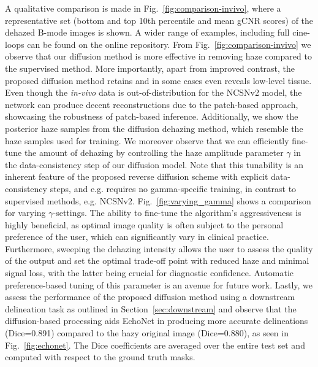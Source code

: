 A qualitative comparison is made in Fig.~\ref{fig:comparison-invivo}, where a representative set (bottom and top 10th percentile and mean gCNR scores) of the dehazed B-mode images is shown. A wider range of examples, including full cine-loops can be found on the online repository. From Fig.~\ref{fig:comparison-invivo} we observe that our diffusion method is more effective in removing haze compared to the supervised method. More importantly, apart from improved contrast, the proposed diffusion method retains and in some cases even reveals low-level tissue. Even though the \emph{in-vivo} data is out-of-distribution for the NCSNv2 model, the network can produce decent reconstructions due to the patch-based approach, showcasing the robustness of patch-based inference. Additionally, we show the posterior haze samples from the diffusion dehazing method, which resemble the haze samples used for training. We moreover observe that we can efficiently fine-tune the amount of dehazing by controlling the haze amplitude parameter $\gamma$ in the data-consistency step of our diffusion model. Note that this tunability is an inherent feature of the proposed reverse diffusion scheme with explicit data-consistency steps, and e.g. requires no gamma-specific training, in contrast to supervised methods, e.g. NCSNv2. Fig.~\ref{fig:varying_gamma} shows a comparison for varying $\gamma$-settings. The ability to fine-tune the algorithm's aggressiveness is highly beneficial, as optimal image quality is often subject to the personal preference of the user, which can significantly vary in clinical practice. Furthermore, sweeping the dehazing intensity allows the user to assess the quality of the output and set the optimal trade-off point with reduced haze and minimal signal loss, with the latter being crucial for diagnostic confidence. Automatic preference-based tuning of this parameter is an avenue for future work. Lastly, we assess the performance of the proposed diffusion method using a downstream delineation task as outlined in Section~\ref{sec:downstream} and observe that the diffusion-based processing aids EchoNet in producing more accurate delineations (Dice=0.891) compared to the hazy original image (Dice=0.880), as seen in Fig.~\ref{fig:echonet}. The Dice coefficients are averaged over the entire test set and computed with respect to the ground truth masks.


